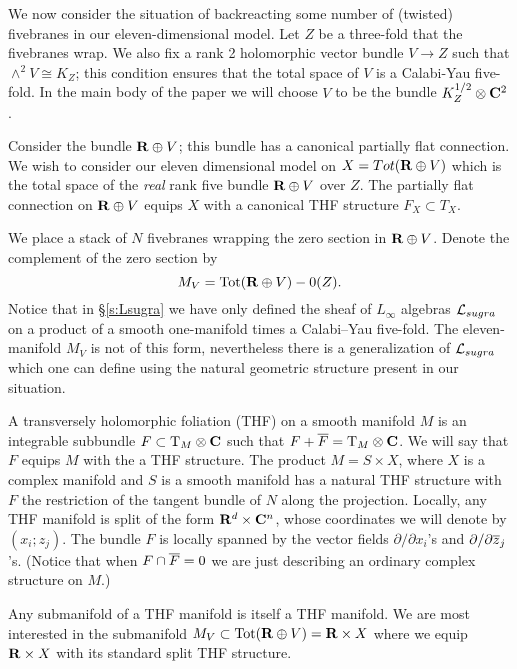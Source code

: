 \parsec[s:brfive]

We now consider the situation of backreacting some number of (twisted) fivebranes in our eleven-dimensional model.
Let $Z$ be a three-fold that the fivebranes wrap.
We also fix a rank 2 holomorphic vector bundle $V\to Z$ such that $\wedge^{2} V \cong K_{Z}$;
this condition ensures that the total space of $V$ is a Calabi-Yau five-fold. In the main body of the paper we will choose $V$ to be the bundle $K_{Z}^{1/2}\otimes \C^{2}$.

Consider the bundle $\R\oplus V$; this bundle has a canonical partially flat connection. We wish to consider our eleven dimensional model on $X = Tot (\R\oplus V)$ which is the total space of the \textit{real} rank five bundle $\R\oplus V$ over $Z$. The partially flat connection on $\R\oplus V$ equips $X$ with a canonical THF structure $F_{X}\subset T_{X}$.

We place a stack of $N$ fivebranes wrapping the zero section in $\R\oplus V$.
Denote the complement of the zero section by
\[
M_V = \text{Tot}(\R\oplus V) - 0(Z).
\]
Notice that in \S \ref{s:Lsugra} we have only defined the sheaf of $L_\infty$ algebras $\cL_{sugra}$ on a product of a smooth one-manifold times a Calabi--Yau five-fold.
The eleven-manifold $M_V$ is not of this form, nevertheless there is a generalization of $\cL_{sugra}$ which one can define using the natural geometric structure present in our situation.

A transversely holomorphic foliation (THF) on a smooth manifold $M$ is an integrable subbundle $F \subset \T_M \otimes \C$ such that $F + \Bar{F} = \T_M \otimes \C$.
We will say that $F$ equips $M$ with the a THF structure.
The product $M = S \times X$, where $X$ is a complex manifold and $S$ is a smooth manifold has a natural THF structure with $F$ the restriction of the tangent bundle of $N$ along the projection.
Locally, any THF manifold is split of the form $\R^d \times \C^n$, whose coordinates we will denote by $(x_i ;  z_j)$.
The bundle $F$ is locally spanned by the vector fields $\partial / \partial x_i$'s and $\del/\del \zbar_j$'s.
(Notice that when $F \cap \Bar{F} = 0$ we are just describing an ordinary complex structure on $M$.)

Any submanifold of a THF manifold is itself a THF manifold.
We are most interested in the submanifold $M_V \subset {\rm Tot}(\R \oplus V) = \R \times X$ where we equip $\R \times X$ with its standard split THF structure.

